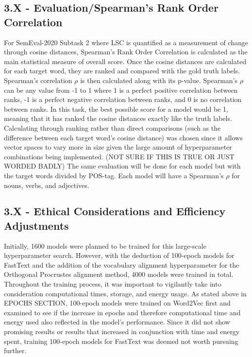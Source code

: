 \subsection{3.X - Evaluation/Spearman's Rank Order Correlation}
For SemEval-2020 Subtask 2 where LSC is quantified as a measurement of change through cosine distances, Spearman’s Rank Order Correlation is calculated as the main statistical measure of overall score. Once the cosine distances are calculated for each target word, they are ranked and compared with the gold truth labels. Spearman's correlation $\rho$ is then calculated along with its p-value. Spearman’s $\rho$ can be any value from -1 to 1 where 1 is a perfect positive correlation between ranks, -1 is a perfect negative correlation between ranks, and 0 is no correlation between ranks. In this task, the best possible score for a model would be 1, meaning that it has ranked the cosine distances exactly like the truth labels. Calculating through ranking rather than direct comparisons (such as the difference between each target word’s cosine distance) was chosen since it allows vector spaces to vary more in size given the large amount of hyperparameter combinations being implemented. (NOT SURE IF THIS IS TRUE OR JUST WORDED BADLY) The same evaluation will be done for each model but with the target words divided by POS-tag. Each model will have a Spearman’s $\rho$ for nouns, verbs, and adjectives. 

\subsection{3.X - Ethical Considerations and Efficiency Adjustments}
\label{exp-ethics}
Initially, 1600 models were planned to be trained for this large-scale hyperparameter search. However, with the deduction of 100-epoch models for FastText and the addition of the vocabulary alignment hyperparameter for the Orthogonal Procrustes alignment method, 4000 models were trained in total. Throughout the training process, it was important to vigilantly take into consideration computational times, storage, and energy usage. As stated above in EPOCHS SECTION, 100-epoch models were trained on Word2Vec first and examined to see if the increase in epochs and therefore computational time and energy used also reflected in the model’s performance. Since it did not show promising results or results that increased in conjunction with time and energy spent, training 100-epoch models for FastText was deemed not worth pursuing further. 

